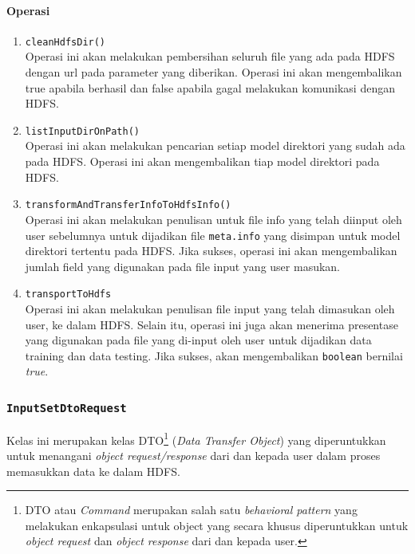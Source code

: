 	\paragraph{Operasi}
		\begin{enumerate}
			\item \texttt{cleanHdfsDir()}\\
			Operasi ini akan melakukan pembersihan seluruh file yang ada pada HDFS dengan url pada parameter yang diberikan. Operasi ini akan mengembalikan true apabila berhasil dan false apabila gagal melakukan komunikasi dengan HDFS.
			
			\item \texttt{listInputDirOnPath()}\\
			Operasi ini akan melakukan pencarian setiap model direktori yang sudah ada pada HDFS. Operasi ini akan mengembalikan tiap model direktori pada HDFS.
			
			\item \texttt{transformAndTransferInfoToHdfsInfo()}\\
			Operasi ini akan melakukan penulisan untuk file info yang telah diinput oleh user sebelumnya untuk dijadikan file \texttt{meta.info} yang disimpan untuk model direktori tertentu pada HDFS. Jika sukses, operasi ini akan mengembalikan jumlah field yang digunakan pada file input yang user masukan.
			
			\item \texttt{transportToHdfs}\\
			Operasi ini akan melakukan penulisan file input yang telah dimasukan oleh user, ke dalam HDFS. Selain itu, operasi ini juga akan menerima presentase yang digunakan pada file yang di-input oleh user untuk dijadikan data training dan data testing. Jika sukses, akan mengembalikan \texttt{boolean} bernilai \textit{true}.
			
		\end{enumerate}
		
	
	
	\subsubsection{\texttt{InputSetDtoRequest}}
	Kelas ini merupakan kelas DTO\footnote{DTO atau \textit{Command} merupakan salah satu \textit{behavioral pattern} yang melakukan enkapsulasi untuk object yang secara khusus diperuntukkan untuk \textit{object request} dan \textit{object response} dari dan kepada user.} (\textit{Data Transfer Object}) yang diperuntukkan untuk menangani \textit{object request/response} dari dan kepada user dalam proses memasukkan data ke dalam HDFS.


